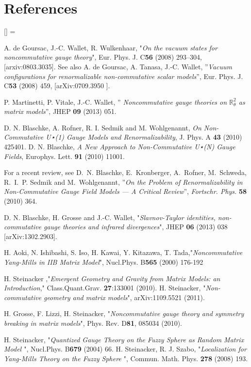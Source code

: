 \documentclass[a4paper,11pt,twoside]{article}
\numberwithin{equation}{section}
\theoremstyle{nonumberplain}
\newcounter{and}
\renewenvironment{thebibliography}[1]{%
\section*{References}%
\frenchspacing\small%
\begin{list}{[\arabic{enumi}]}%
{%
\usecounter{enumi}\parsep=2pt\topsep 0pt%
\settowidth{\labelwidth}{[#1]}%
\leftmargin=\labelwidth\advance\leftmargin\labelsep%
\rightmargin=0pt\itemsep=1pt\sloppy%
}%
}{\end{list}}
\begin{document}
\begin{thebibliography}{88}
%
A. de Goursac, J.-C. Wallet, R. Wulkenhaar, "{\it{On the vacuum states for noncommutative gauge theory}}", {Eur. Phys. J. C\textbf{56} (2008) 293--304}, %
[arxiv:0803.3035].
See also A. de Goursac, A. Tanasa, J.-C. Wallet, ''{\it{Vacuum configurations for renormalizable non-commutative scalar models}}'', Eur. Phys. J. C{\bf{53}} (2008) 459, [arXiv:0709.3950 ].

 P. Martinetti, P. Vitale, J.-C. Wallet, ''{\it{ Noncommutative gauge theories on $\mathbb{R}^2_\theta$ as matrix models}}'', JHEP \textbf{09} (2013) 051.

 D. N. Blaschke, A. Rofner, R. I. Sedmik and M. Wohlgenannt, {\it{On Non-Commutative U⋆(1) Gauge Models and Renormalizability}}, J. Phys. A {\bf{43}} (2010) 425401. D. N. Blaschke, {\it{A New Approach to Non-Commutative U⋆(N) Gauge Fields}}, Europhys. Lett. {\bf{91}} (2010) 11001.

For a recent review, see D.~N. Blaschke, E.~Kronberger, A.~Rofner, M.~Schweda, R.~I.~P. Sedmik and
  M.~Wohlgenannt, ''\textit{{On the Problem of Renormalizability in
  Non-Commutative Gauge Field Models --- A Critical Review}}'', \textit{Fortschr.
  Phys.} \textbf{58} (2010) 364.

 D. N. Blaschke, H. Grosse and J.-C. Wallet, "{\it {Slavnov-Taylor identities, non-commutative gauge theories and infrared divergences}}", JHEP {\bf{06}} (2013) 038 [arXiv:1302.2903].

 H. Aoki, N. Ishibashi, S. Iso, H. Kawai, Y. Kitazawa, T. Tada,"{\it{Noncommutative Yang-Mills in IIB Matrix Model}}", Nucl.Phys. B{\bf{565}} (2000) 176-192 

 H. Steinacker ,"{\it{Emergent Geometry and Gravity from Matrix Models: an Introduction}}," Class.Quant.Grav. {\bf{27}}:133001 (2010). H. Steinacker, "{\it{Non-commutative geometry and matrix models}}", arXiv:1109.5521 (2011).

 H. Grosse, F. Lizzi, H. Steinacker, "{\it{Noncommutative gauge theory and symmetry breaking in matrix models}}", Phys. Rev. D{\bf{81}}, 085034 (2010).

  H. Steinacker, "{\it{Quantized Gauge Theory on the Fuzzy Sphere as Random Matrix Model }}", Nucl.Phys. B{\bf{679}} (2004) 66. H. Steinacker, R. J. Szabo, "{\it{Localization for Yang-Mills Theory on the Fuzzy Sphere }}", Commun. Math. Phys. {\bf{278}} (2008) 193.


\end{thebibliography}
\end{document}
